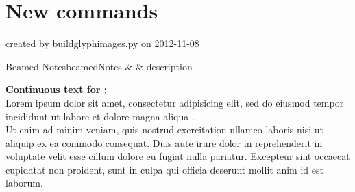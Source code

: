 \documentclass{scrartcl}
\begin{document}

\section*{New \lilyglyphs{} commands}
created by buildglyphimages.py on 2012-11-08


\begin{reftable}{Beamed Notes}{beamedNotes}
\twoBeamedQuavers &  & description\\
\end{reftable}



\noindent\textbf{\textsf{Continuous text for} :}\\
Lorem ipsum dolor sit amet, consectetur adipisicing elit,
sed \twoBeamedQuavers do eiusmod tempor incididunt ut labore et dolore magna aliqua \twoBeamedQuavers*.\\
\twoBeamedQuavers Ut enim ad minim veniam, quis nostrud exercitation ullamco laboris nisi ut aliquip
ex ea commodo consequat. Duis aute irure dolor in reprehenderit in voluptate velit esse
cillum dolore eu fugiat nulla pariatur\twoBeamedQuavers.
\twoBeamedQuavers Excepteur sint occaecat cupidatat non proident, sunt in culpa qui officia deserunt mollit anim id est laborum.

\bigskip
\end{document}
